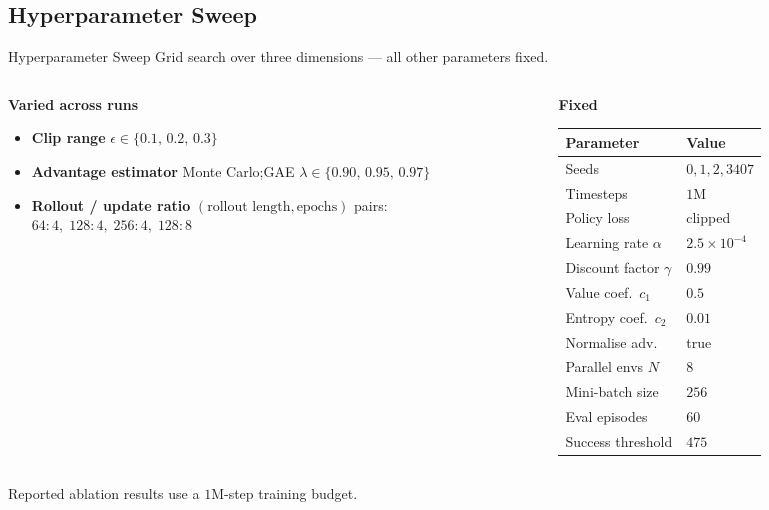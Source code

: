 \documentclass[aspectratio=169, 11pt]{beamer}
\begin{document}
\subsection{Hyperparameter Sweep}
\begin{frame}{Hyperparameter Sweep}
  \small
  Grid search over three dimensions --- all other parameters fixed.

  \vspace{0.5em}
  \begin{columns}[T,onlytextwidth]
    \begin{column}{0.52\textwidth}
      \textbf{Varied across runs}\\[0.35em]
      \begin{itemize}
        \setlength\itemsep{0.55em}
        \item \textbf{Clip range}\quad
          $\epsilon \in \{0.1,\,0.2,\,0.3\}$
        \item \textbf{Advantage estimator}\quad
          Monte Carlo;\quad GAE $\lambda \in \{0.90,\,0.95,\,0.97\}$
        \item \textbf{Rollout / update ratio}\quad
          $(\text{rollout length},\text{epochs})$ pairs:\\[0.15em]
          \hspace*{1.2em}$64{:}4,\;128{:}4,\;256{:}4,\;128{:}8$
      \end{itemize}
    \end{column}

    \hspace*{0.03\textwidth}
    \begin{column}{0.42\textwidth}
      \textbf{Fixed}\\[0.25em]
      {\tiny
      \renewcommand{\arraystretch}{1.12}
      \begin{tabular}{@{}ll@{}}
        \toprule
        Parameter & Value \\
        \midrule
        Seeds & $0,1,2,3407$ \\
        Timesteps & $1\mathrm{M}$ \\
        Policy loss & clipped \\
        Learning rate $\alpha$ & $2.5\times10^{-4}$ \\
        Discount factor $\gamma$ & $0.99$ \\
        Value coef.\ $c_1$ & $0.5$ \\
        Entropy coef.\ $c_2$ & $0.01$ \\
        Normalise adv. & true \\
        Parallel envs $N$ & $8$ \\
        Mini-batch size & $256$ \\
        Eval episodes & $60$ \\
        Success threshold & $475$ \\
        \bottomrule
      \end{tabular}
      }
    \end{column}
  \end{columns}

  \vspace{0.45em}
  {\scriptsize Reported ablation results use a $1\mathrm{M}$-step training budget.}
\end{frame}
\end{document}
